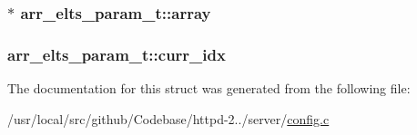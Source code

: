 \subsubsection[{\texorpdfstring{array}{array}}]{$\ast$ arr\+\_\+elts\+\_\+param\+\_\+t\+::array}\hypertarget{structarr__elts__param__t_acb3c71b68221be40f2e544dad3998d4a}{}\label{structarr__elts__param__t_acb3c71b68221be40f2e544dad3998d4a}
\subsubsection[{\texorpdfstring{curr\+\_\+idx}{curr_idx}}]{ arr\+\_\+elts\+\_\+param\+\_\+t\+::curr\+\_\+idx}\hypertarget{structarr__elts__param__t_acc524b7d0b8a67097cf142acb9aceca3}{}\label{structarr__elts__param__t_acc524b7d0b8a67097cf142acb9aceca3}


The documentation for this struct was generated from the following file\+:\begin{DoxyCompactItemize}
\item 
/usr/local/src/github/\+Codebase/httpd-\/2../server/\hyperlink{config_8c}{config.\+c}\end{DoxyCompactItemize}
